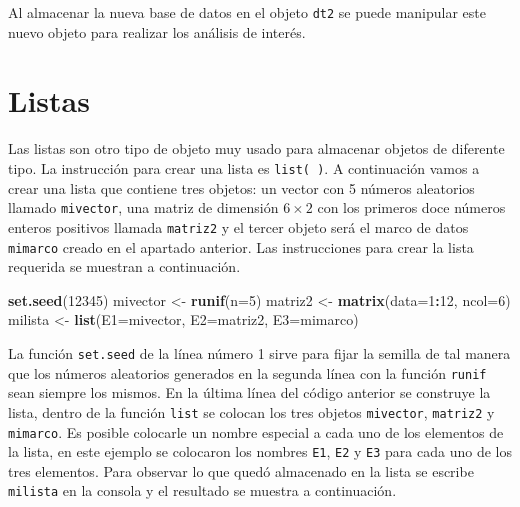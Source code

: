 \documentclass[10pt,]{krantz}
\makeatletter
\newenvironment{Shaded}{\begin{snugshade}}{\end{snugshade}}
\newcommand{\KeywordTok}[1]{\textcolor[rgb]{0.13,0.29,0.53}{\textbf{#1}}}
\newcommand{\DataTypeTok}[1]{\textcolor[rgb]{0.13,0.29,0.53}{#1}}
\newcommand{\DecValTok}[1]{\textcolor[rgb]{0.00,0.00,0.81}{#1}}
\newcommand{\StringTok}[1]{\textcolor[rgb]{0.31,0.60,0.02}{#1}}
\newcommand{\OperatorTok}[1]{\textcolor[rgb]{0.81,0.36,0.00}{\textbf{#1}}}
\newcommand{\NormalTok}[1]{#1}
\newenvironment{kframe}{%
\medskip{}
\setlength{\fboxsep}{.8em}
 \def\at@end@of@kframe{}%
 \ifinner\ifhmode%
  \def\at@end@of@kframe{\end{minipage}}%
  \begin{minipage}{\columnwidth}%
 \fi\fi%
 \def\FrameCommand##1{\hskip\@totalleftmargin \hskip-\fboxsep
 \colorbox{shadecolor}{##1}\hskip-\fboxsep
     \hskip-\linewidth \hskip-\@totalleftmargin \hskip\columnwidth}%
 \MakeFramed {\advance\hsize-\width
   \@totalleftmargin\z@ \linewidth\hsize
   \@setminipage}}%
 {\par\unskip\endMakeFramed%
 \at@end@of@kframe}
\renewenvironment{Shaded}{\begin{kframe}}{\end{kframe}}
\makeatother
\begin{document}
Al almacenar la nueva base de datos en el objeto \texttt{dt2} se puede
manipular este nuevo objeto para realizar los análisis de interés.

\section{\texorpdfstring{Listas 
}{Listas  }}\label{listas}

Las listas son otro tipo de objeto muy usado para almacenar objetos de
diferente tipo. La instrucción para crear una lista es
\texttt{list(\ )}. A continuación vamos a crear una lista que contiene
tres objetos: un vector con 5 números aleatorios llamado
\texttt{mivector}, una matriz de dimensión \(6 \times 2\) con los
primeros doce números enteros positivos llamada \texttt{matriz2} y el
tercer objeto será el marco de datos \texttt{mimarco} creado en el
apartado anterior. Las instrucciones para crear la lista requerida se
muestran a continuación.

\begin{Shaded}
\begin{Highlighting}[]
\KeywordTok{set.seed}\NormalTok{(}\DecValTok{12345}\NormalTok{)}
\NormalTok{mivector <-}\StringTok{ }\KeywordTok{runif}\NormalTok{(}\DataTypeTok{n=}\DecValTok{5}\NormalTok{)}
\NormalTok{matriz2 <-}\StringTok{ }\KeywordTok{matrix}\NormalTok{(}\DataTypeTok{data=}\DecValTok{1}\OperatorTok{:}\DecValTok{12}\NormalTok{, }\DataTypeTok{ncol=}\DecValTok{6}\NormalTok{)}
\NormalTok{milista <-}\StringTok{ }\KeywordTok{list}\NormalTok{(}\DataTypeTok{E1=}\NormalTok{mivector, }\DataTypeTok{E2=}\NormalTok{matriz2, }\DataTypeTok{E3=}\NormalTok{mimarco)}
\end{Highlighting}
\end{Shaded}

La función \texttt{set.seed} de la línea número 1 sirve para fijar la
semilla de tal manera que los números aleatorios generados en la segunda
línea con la función \texttt{runif} sean siempre los mismos. En la
última línea del código anterior se construye la lista, dentro de la
función \texttt{list} se colocan los tres objetos \texttt{mivector},
\texttt{matriz2} y \texttt{mimarco}. Es posible colocarle un nombre
especial a cada uno de los elementos de la lista, en este ejemplo se
colocaron los nombres \texttt{E1}, \texttt{E2} y \texttt{E3} para cada
uno de los tres elementos. Para observar lo que quedó almacenado en la
lista se escribe \texttt{milista} en la consola y el resultado se
muestra a continuación.
\end{document}
